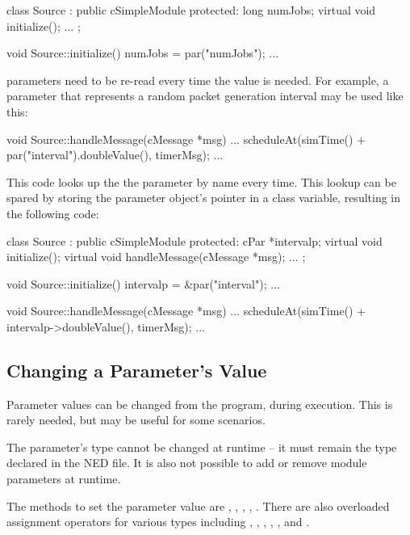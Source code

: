 \begin{cpp}
class Source : public cSimpleModule
{
  protected:
    long numJobs;
    virtual void initialize();
    ...
};

void Source::initialize()
{
    numJobs = par("numJobs");
    ...
}
\end{cpp}

 parameters need to be re-read every time the value is needed.
For example, a parameter that represents a random packet generation interval
may be used like this:

\begin{cpp}
void Source::handleMessage(cMessage *msg)
{
    ...
    scheduleAt(simTime() + par("interval").doubleValue(), timerMsg);
    ...
}
\end{cpp}

This code looks up the the parameter by name every time. This lookup
can be spared by storing the parameter object's pointer in a class variable,
resulting in the following code:

\begin{cpp}
class Source : public cSimpleModule
{
  protected:
    cPar *intervalp;
    virtual void initialize();
    virtual void handleMessage(cMessage *msg);
    ...
};

void Source::initialize()
{
    intervalp = &par("interval");
    ...
}

void Source::handleMessage(cMessage *msg)
{
    ...
    scheduleAt(simTime() + intervalp->doubleValue(), timerMsg);
    ...
}
\end{cpp}


\subsection{Changing a Parameter's Value}
\label{sec:simple-modules:setting-parameters}

Parameter values can be changed from the program, during execution.
This is rarely needed, but may be useful for some scenarios.

\begin{note}
    The parameter's type cannot be changed at runtime -- it must
    remain the type declared in the NED file. It is also not possible
    to add or remove module parameters at runtime.
\end{note}

The methods to set the parameter value are ,
, ,
, . There are also
overloaded assignment operators for various types including ,
, , , , and
.

